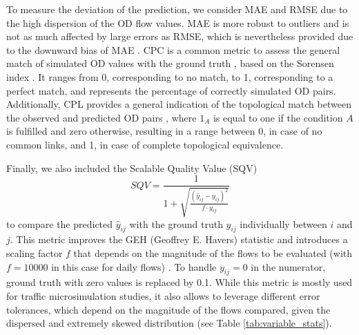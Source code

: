To measure the deviation of the prediction, we consider MAE and RMSE due to the high dispersion of the OD flow values. MAE is more robust to outliers and is not as much affected by large errors as RMSE, which is nevertheless provided due to the downward bias of MAE \citep{Yeghikyan2020LearningNetworks}. CPC is a common metric to assess the general match of simulated OD values with the ground truth \citep{Lenormand2012ANetworks}, based on the Sorensen index \citep{Sorensen1948AContent}. It ranges from 0, corresponding to no match, to 1, corresponding to a perfect match, and represents the percentage of correctly simulated OD pairs. Additionally, CPL provides a general indication of the topological match between the observed and predicted OD pairs \citep{Lenormand2016SystematicModels}, where $1_A$ is equal to one if the condition $A$ is fulfilled and zero otherwise, resulting in a range between 0, in case of no common links, and 1, in case of complete topological equivalence. 

Finally, we also included the Scalable Quality Value (SQV) 
\begin{equation}
\label{eq:SQV}
SQV = \frac{1}{1 + \sqrt{\frac{{(\hat{y}_{ij} - y_{ij})^2}}{{f \cdot y_{ij}}}}}
\end{equation}
to compare the predicted $\hat{y}_{ij}$ with the ground truth $y_{ij}$ individually between $i$ and $j$. This metric improves the GEH (Geoffrey E. Havers) statistic \citep{Dowling2004TrafficSoftware} and introduces a scaling factor $f$ that depends on the magnitude of the flows to be evaluated (with $f=10000$ in this case for daily flows) \citep{Friedrich2019ScalableValidation}. To handle $y_{ij}=0$ in the numerator, ground truth with zero values is replaced by 0.1. While this metric is mostly used for traffic microsimulation studies, it also allows to leverage different error tolerances, which depend on the magnitude of the flows compared, given the dispersed and extremely skewed distribution (see Table \ref{tab:variable_stats}).



